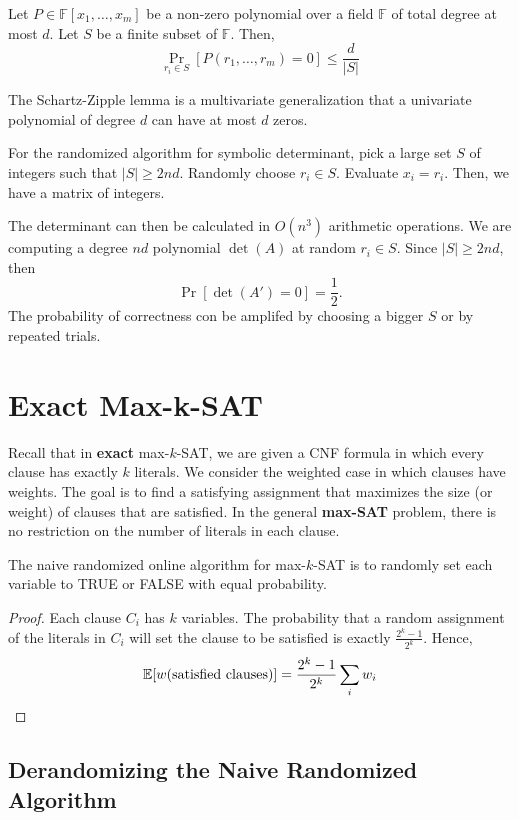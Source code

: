 \begin{lemma}
    Let $P \in \mathbb{F}[x_1,\ldots,x_m]$ be a non-zero polynomial over a field $\mathbb{F}$ of total degree at most $d$. Let $S$ be a finite subset of $\mathbb{F}$. Then,
    $$
    \Pr_{r_i \in S} [P(r_1,\ldots,r_m) = 0] \leq \frac{d}{|S|} 
    $$
\end{lemma}
The Schartz-Zipple lemma is a multivariate generalization that a univariate polynomial of degree $d$ can have at most $d$ zeros.

For the randomized algorithm for symbolic determinant, pick a large set $S$ of integers such that $|S| \geq 2nd$. Randomly choose $r_i \in S$. Evaluate $x_i = r_i$. Then, we have a matrix of integers.

The determinant can then be calculated in $O(n^3)$ arithmetic operations. We are computing a degree $nd$ polynomial $\det(A)$ at random $r_i \in S$. Since $|S| \geq 2nd$, then
$$
\Pr[\det(A') = 0] = \frac{1}{2}.
$$
The probability of correctness con be amplifed by choosing a bigger $S$ or by repeated trials.

\section{Exact Max-k-SAT}

Recall that in \textbf{exact} max-$k$-SAT, we are given a CNF formula in which every clause has exactly $k$ literals. We consider the weighted case in which clauses have weights. The goal is to find a satisfying assignment that maximizes the size (or weight) of clauses that are satisfied. In the general \textbf{max-SAT} problem, there is no restriction on the number of literals in each clause.

The naive randomized online algorithm for max-$k$-SAT is to randomly set each variable to TRUE or FALSE with equal probability.

\begin{proof}
    Each clause $C_i$ has $k$ variables. The probability that a random assignment of the literals in $C_i$ will set the clause to be satisfied is exactly $\frac{2^{k} - 1}{2^k}$. Hence,
    $$
    \mathbb{E}[w(\text{satisfied clauses})] = \frac{2^k - 1}{2^k} \sum_{i} w_i
    $$
\end{proof}

\subsection{Derandomizing the Naive Randomized Algorithm}

